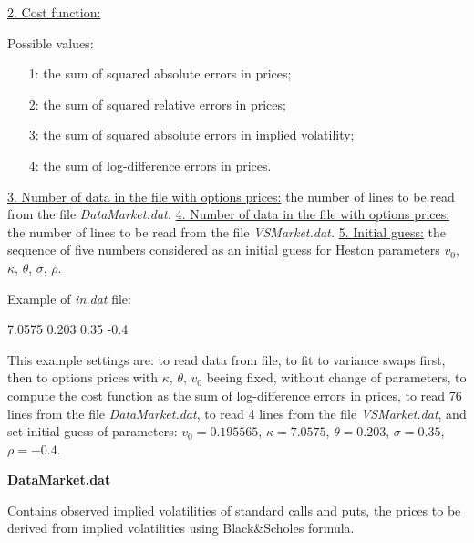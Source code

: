 \documentclass[12pt,amsfonts,enumerate,amscd]{amsart}
\numberwithin{table}{section}
\numberwithin{equation}{section}
\begin{document}
\vskip0.2cm
\underline{2. Cost function:}

Possible values:
\begin{itemize}
\item[1:] the sum of squared absolute errors in prices;

\item[2:] the sum of squared relative errors in prices;

\item[3:] the sum of squared absolute errors in implied volatility;

\item[4:] the sum of log-difference errors in prices.
\end{itemize}

\vskip0.2cm
\underline{3. Number of data in the file with options prices:} the number of lines to be read from the file \textit{DataMarket.dat.}
\vskip0.2cm
\underline{4. Number of data in the file with options prices:} the number of lines to be read from the file \textit{VSMarket.dat.}
\vskip0.2cm
\underline{5. Initial guess:} the sequence of five numbers considered as an initial guess for Heston parameters $v_0$, $\kappa$, $\theta$, $\sigma$, $\rho$.
 
\vskip0.2cm
Example of \textit{in.dat} file:
\vskip0.2cm

 7.0575 0.203 0.35 -0.4

\vskip0.2cm
This example settings are: to read data from file, to fit to variance swaps first, then to options prices with $\kappa$, $\theta$, $v_0$ beeing fixed, without change of parameters, to compute the cost function as the sum of log-difference errors in prices, to read 76 lines from the file \textit{DataMarket.dat}, to read 4 lines from the file \textit{VSMarket.dat}, and set initial guess of parameters: $v_0=0.195565$, $\kappa=7.0575$, $\theta=0.203$, $\sigma=0.35$, $\rho=-0.4$.

\vskip0.5cm

\textbf{DataMarket.dat}

Contains observed implied volatilities of standard calls and puts, the prices to be derived from implied volatilities using Black\&Scholes formula.
 
\end{document}
